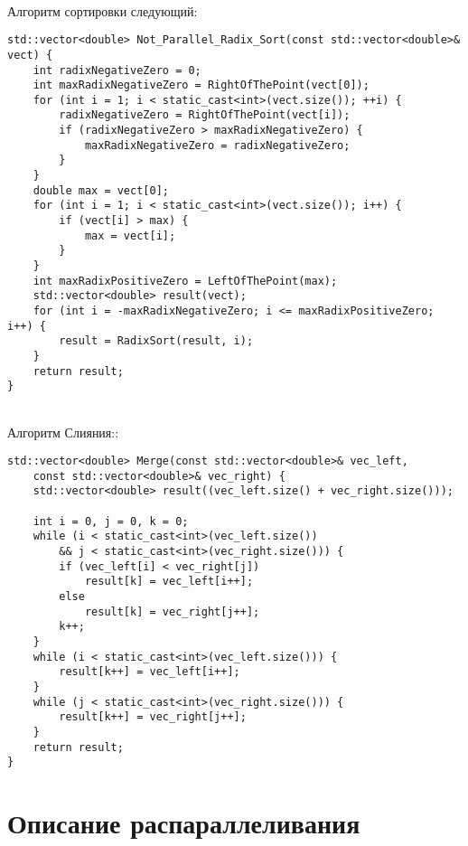 \documentclass[12pt,a4paper]{article}
\begin{document}
\paragraph{}Алгоритм сортировки следующий: 
\begin{lstlisting}
std::vector<double> Not_Parallel_Radix_Sort(const std::vector<double>& vect) {
    int radixNegativeZero = 0;
    int maxRadixNegativeZero = RightOfThePoint(vect[0]);
    for (int i = 1; i < static_cast<int>(vect.size()); ++i) {
        radixNegativeZero = RightOfThePoint(vect[i]);
        if (radixNegativeZero > maxRadixNegativeZero) {
            maxRadixNegativeZero = radixNegativeZero;
        }
    }
    double max = vect[0];
    for (int i = 1; i < static_cast<int>(vect.size()); i++) {
        if (vect[i] > max) {
            max = vect[i];
        }
    }
    int maxRadixPositiveZero = LeftOfThePoint(max);
    std::vector<double> result(vect);
    for (int i = -maxRadixNegativeZero; i <= maxRadixPositiveZero; i++) {
        result = RadixSort(result, i);
    }
    return result;
}
\end{lstlisting}
\paragraph{}Алгоритм Слияния:: 
\begin{lstlisting}
std::vector<double> Merge(const std::vector<double>& vec_left,
    const std::vector<double>& vec_right) {
    std::vector<double> result((vec_left.size() + vec_right.size()));

    int i = 0, j = 0, k = 0;
    while (i < static_cast<int>(vec_left.size())
        && j < static_cast<int>(vec_right.size())) {
        if (vec_left[i] < vec_right[j])
            result[k] = vec_left[i++];
        else
            result[k] = vec_right[j++];
        k++;
    }
    while (i < static_cast<int>(vec_left.size())) {
        result[k++] = vec_left[i++];
    }
    while (j < static_cast<int>(vec_right.size())) {
        result[k++] = vec_right[j++];
    }
    return result;
}
\end{lstlisting}

\part*{Описание распараллеливания}
\end{document}
